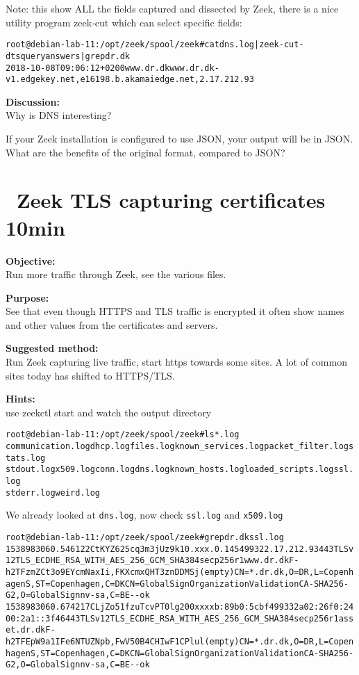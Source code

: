 \documentclass[a4paper,11pt,notitlepage]{report}
\begin{document}
Note: this show ALL the fields captured and dissected by Zeek, there is a nice utility program zeek-cut which can select specific fields:

\begin{alltt}\small
root@debian-lab-11:/opt/zeek/spool/zeek# cat dns.log | zeek-cut -d ts query answers | grep dr.dk
2018-10-08T09:06:12+0200	www.dr.dk	www.dr.dk-v1.edgekey.net,e16198.b.akamaiedge.net,2.17.212.93
\end{alltt}

{\bf Discussion:}\\
Why is DNS interesting?

If your Zeek installation is configured to use JSON, your output will be in JSON. What are the benefits of the original format, compared to JSON?

\chapter{\faExclamationTriangle\ Zeek TLS capturing certificates 10min}
\label{ex:zeektlsbasic}


{\bf Objective:} \\
Run more traffic through Zeek, see the various files.


{\bf Purpose:}\\
See that even though HTTPS and TLS traffic is encrypted it often show names and other values from the certificates and servers.


{\bf Suggested method:}\\
Run Zeek capturing live traffic, start https towards some sites. A lot of common sites today has shifted to HTTPS/TLS.


{\bf Hints:}\\
use zeekctl start and watch the output directory

\begin{alltt}\small
root@debian-lab-11:/opt/zeek/spool/zeek# ls *.log
communication.log  dhcp.log files.log known_services.log packet_filter.log  stats.log
stdout.log x509.log conn.log dns.log known_hosts.log loaded_scripts.log  ssl.log
stderr.log weird.log
\end{alltt}

We already looked at \verb+dns.log+, now check \verb+ssl.log+ and \verb+x509.log+

\begin{alltt}\small
root@debian-lab-11:/opt/zeek/spool/zeek# grep dr.dk ssl.log
1538983060.546122	CtKYZ625cq3m3jUz9k	10.xxx.0.145	49932	2.17.212.93	443	TLSv12	TLS_ECDHE_RSA_WITH_AES_256_GCM_SHA384	secp256r1	www.dr.dk	F	-	h2	T	FzmZCt3o9EYcmNaxIi,FKXcmxQHT3znDDMSj	(empty)	CN=*.dr.dk,O=DR,L=Copenhagen S,ST=Copenhagen,C=DK	CN=GlobalSign Organization Validation CA - SHA256 - G2,O=GlobalSign nv-sa,C=BE	-	-	ok
1538983060.674217	CLjZo51fzuTcvPT0lg	200xxxxb:89b0:5cbf	49933	2a02:26f0:2400:2a1::3f46	443	TLSv12	TLS_ECDHE_RSA_WITH_AES_256_GCM_SHA384	secp256r1	asset.dr.dk	F	-	h2	TFEpW9a1IFe6NTUZNpb,FwV50B4CHIwF1CPlul	(empty)	CN=*.dr.dk,O=DR,L=Copenhagen S,ST=Copenhagen,C=DK	CN=GlobalSign Organization Validation CA - SHA256 - G2,O=GlobalSign nv-sa,C=BE	-	-	ok
\end{alltt}
\end{document}
